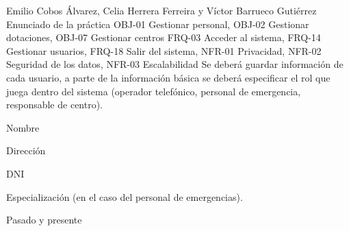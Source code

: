 {Emilio Cobos Álvarez, Celia Herrera Ferreira y Víctor Barrueco Gutiérrez}
{Enunciado de la práctica}
{OBJ-01 Gestionar personal, OBJ-02 Gestionar dotaciones, OBJ-07 Gestionar centros}
{FRQ-03 Acceder al sistema, FRQ-14 Gestionar usuarios, FRQ-18 Salir del sistema, NFR-01 Privacidad, NFR-02 Seguridad de los datos, NFR-03 Escalabilidad}
{Se deberá guardar información de cada usuario, a parte de la información básica se deberá especificar el rol que juega dentro del sistema (operador telefónico, personal de emergencia, responsable de centro).}
{
\item{Nombre}
\item{Dirección}
\item{DNI}
\item{Especialización (en el caso del personal de emergencias).}
}
{Pasado y presente}

